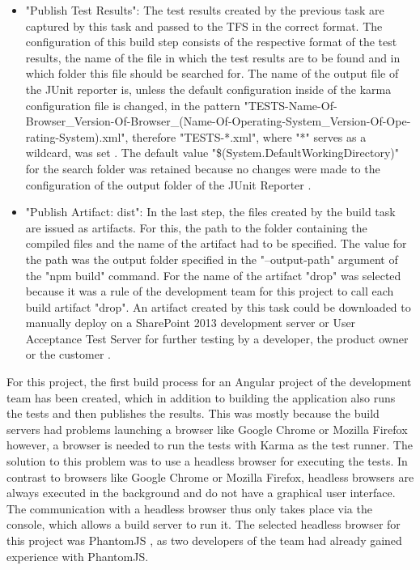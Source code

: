\documentclass[Bachelor,BIF,english]{twbook}
\begin{document}
\begin{itemize}
\item "Publish Test Results": The test results created by the previous task are captured by this task and passed to the TFS in the correct format. The configuration of this build step consists of the respective format of the test results, the name of the file in which the test results are to be found and in which folder this file should be searched for. The name of the output file of the JUnit reporter is, unless the default configuration inside of the karma configuration file is changed, in the pattern "TESTS-Name-Of-Browser{\_}Version-Of-Browser{\_}(Name-Of-Operating-System{\_}Version-Of-Ope-\\rating-System).xml", therefore "TESTS-*.xml", where "*" serves as a wildcard, was set \cite{KarmaJUnitReporterConfig}. The default value "\$(System.DefaultWorkingDirectory)" for the search folder was retained because no changes were made to the configuration of the output folder of the JUnit Reporter \cite{TFSPublishBuildArtifact}.
\item "Publish Artifact: dist": In the last step, the files created by the build task are issued as artifacts. For this, the path to the folder containing the compiled files and the name of the artifact had to be specified. The value for the path was the output folder specified in the "--output-path" argument of the "npm build" command. For the name of the artifact "drop" was selected because it was a rule of the development team for this project to call each build artifact "drop". An artifact created by this task could be downloaded to manually deploy on a SharePoint 2013 development server or User Acceptance Test Server for further testing by a developer, the product owner or the customer \cite{TFSPublishBuildArtifact}.
\end{itemize}
For this project, the first build process for an Angular project of the development team has been created, which in addition to building the application also runs the tests and then publishes the results. This was mostly because the build servers had problems launching a browser like Google Chrome \cite{Chrome} or Mozilla Firefox \cite{Firefox} however, a browser is needed to run the tests with Karma as the test runner. The solution to this problem was to use a headless browser \cite[p.~2]{HeadlessBrowser} for executing the tests. In contrast to browsers like Google Chrome or Mozilla Firefox, headless browsers are always executed in the background and do not have a graphical user interface. The communication with a headless browser thus only takes place via the console, which allows a build server to run it. The selected headless browser for this project was PhantomJS \cite{PhantomJS}, as two developers of the team had already gained experience with PhantomJS.
\end{document}
